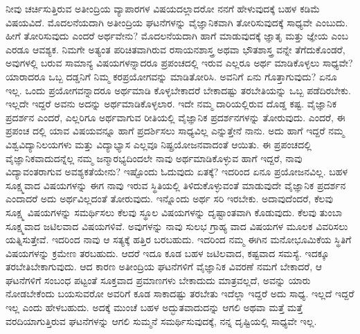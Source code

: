 ನೀವು ಚರ್ಚಿಸುತ್ತಿರುವ ಅತೀಂದ್ರಿಯ ವ್ಯಾಪಾರಗಳ ವಿಷಯದಲ್ಲಾದರೋ ನನಗೆ ಹೇಳುವುದಕ್ಕೆ ಬಹಳ ಕಡಿಮೆ ವಿಷಯವಿದೆ. ಮೊದಲನೆಯದಾಗಿ ಅತೀಂದ್ರಿಯ ಘಟನೆಗಳನ್ನು ವೈಜ್ಞಾನಿಕವಾಗಿ ತೋರಿಸುವುದಕ್ಕೆ ಸಾಧ್ಯವೇ ಎಂಬುದು. ಹೀಗೆ ತೋರಿಸುವುದು ಎಂದರೆ ಅರ್ಥವೇನು? ಮೊದಲನೆಯದಾಗಿ ಹಾಗೆ ಮಾಡುವುದಕ್ಕೆ ಜ್ಞಾತೃ ಮತ್ತು ಜ್ಞೇಯ ಎಂಬ ಎರಡೂ ಆವಶ್ಯಕ. ನಿಮಗೇ ಅತ್ಯಂತ ಪರಿಚಿತವಾಗಿರುವ ರಸಾಯನಶಾಸ್ತ್ರ ಅಥವಾ ಭೌತಶಾಸ್ತ್ರ ವನ್ನೇ ತೆಗೆದುಕೊಂಡರೆ, ಅವುಗಳಲ್ಲಿ ಬರುವ ಸಾಮಾನ್ಯ ವಿಷಯಗಳನ್ನಾದರೂ ಪ್ರಪಂಚದಲ್ಲಿ ಇರುವ ಎಲ್ಲರೂ ಅರ್ಥ ಮಾಡಿಕೊಳ್ಳಲು ಸಾಧ್ಯವೇ? ಯಾರಾದರೂ ಒಬ್ಬ ದಡ್ಡನಿಗೆ ನಿಮ್ಮ ಕರಪ್ರಯೋಗವನ್ನು ಮಾಡಿತೋರಿಸಿ. ಅವನಿಗೆ ಏನು ಗೊತ್ತಾಗುವುದು? ಏನೂ ಇಲ್ಲ. ಒಂದು ಪ್ರಯೋಗವನ್ನಾದರೂ ಅರ್ಥಮಾಡಿ ಕೊಳ್ಳಬೇಕಾದರೆ ಬೇಕಾದಷ್ಟು ತರಬೇತಿಯನ್ನು ಒಬ್ಬ ಪಡೆದಿರಬೇಕು. ಇಲ್ಲದೇ ಇದ್ದರೆ ಅವನು ಅದನ್ನು ಅರ್ಥಮಾಡಿಕೊಳ್ಳಲಾರ. ಇದೇ ನಮ್ಮ ದಾರಿಯಲ್ಲಿರುವ ದೊಡ್ಡ ಕಷ್ಟ. ವೈಜ್ಞಾನಿಕ ಪ್ರದರ್ಶನ ಎಂದರೆ, ಎಲ್ಲರಿಗೂ ಅರ್ಥವಾಗುವ ರೀತಿಯಲ್ಲಿ ವೈಜ್ಞಾನಿಕ ಪ್ರದರ್ಶನಗಳನ್ನು ತೋರುವುದು. ಎಂದರೆ, ಈ ಪ್ರಪಂಚ ದಲ್ಲಿ ಯಾವ ವಿಷಯವನ್ನೂ ಹಾಗೆ ಪ್ರದರ್ಶಿಸಲು ಸಾಧ್ಯವಿಲ್ಲ ಎನ್ನುತ್ತೇನೆ ನಾನು. ಅದು ಹಾಗೆ ಇದ್ದರೆ ನಮ್ಮ ವಿಶ್ವವಿದ್ಯಾನಿಲಯಗಳು ಮತ್ತು ವಿದ್ಯಾಭ್ಯಾಸ ಎಲ್ಲವೂ ನಿಷ್ಪ್ರಯೋಜನವಾದಂತೆ ಆಯಿತು. ಈ ಪ್ರಪಂಚದಲ್ಲಿ ವೈಜ್ಞಾನಿಕವಾದುದನ್ನೆಲ್ಲ ನಮ್ಮ ಜನ್ಮಾರಭ್ಯದಿಂದಲೇ ನಾವು ಅರ್ಥಮಾಡಿಕೊಳ್ಳುವ ಹಾಗೆ ಇದ್ದರೆ, ನಾವು ವಿದ್ಯಾವಂತರಾಗುವ ಅವಶ್ಯಕತೆಯೇನು? ಇಷ್ಟೊಂದು ಓದುವುದು ಏತಕ್ಕೆ? ಇದರಿಂದ ಏನೂ ಪ್ರಯೋಜನವಿಲ್ಲ. ಬಹಳ ಸೂಕ್ಷ್ಮವಾದ ವಿಷಯಗಳನ್ನು ಈಗ ನಾವು ಇರುವ ಸ್ಥಿತಿಯಲ್ಲಿ ತಿಳಿದುಕೊಳ್ಳುವಂತೆ ಮಾಡುವುದೇ ವೈಜ್ಞಾನಿಕ ಪ್ರದರ್ಶನ ಎಂದಾದರೆ ಅದು ಅರ್ಥವಿಲ್ಲದಂತೆ ತೋರುವುದು. ಇನ್ನೊಂದು ಅರ್ಥ ಸರಿ ಇರಬೇಕು. ಅದಾವುದೆಂದರೆ, ಕೆಲವು ಸೂಕ್ಷ್ಮ ವಿಷಯಗಳನ್ನು ಸಮರ್ಥಿಸಲು ಕೆಲವು ಸ್ಥೂಲ ವಿಷಯಗಳನ್ನು ದೃಷ್ಟಾಂತವಾಗಿ ಕೊಡುವುದು. ಕೆಲವು ತುಂಬಾ ಸೂಕ್ಷ್ಮವಾದ ಜಟಿಲವಾದ ವಿಷಯಗಳಿವೆ. ಅವುಗಳನ್ನು ನಾವು ಸುಲಭ ಗ್ರಾಹ್ಯ ವಾದ ವಿಷಯಗಳ ಮೂಲಕ ವಿವರಿಸಲು ಯತ್ನಿಸುತ್ತೇವೆ. ಇದರಿಂದ ನಾವು ಆ ಸತ್ಯಕ್ಕೆ ಹತ್ತಿರ ಬರಬಹುದು. ಇದರಿಂದ ನಮ್ಮ ಈಗಿನ ಮನೋಭೂಮಿಕೆಯ ಸ್ಥಿತಿಗೆ ವಿಷಯಗಳನ್ನು ಕ್ರಮೇಣ ತರಬಹುದು. ಆದರೆ ಇದೂ ಕೂಡ ಬಹಳ ಜಟಿಲವಾದ, ಕಷ್ಟವಾದ ಸಮಸ್ಯೆ. ಇದಕ್ಕೂ ತರಬೇತಿಬೇಕಾಗುವುದು. ಆದ ಕಾರಣ ಅತೀಂದ್ರಿಯ ಘಟನೆಗಳಿಗೆ ವೈಜ್ಞಾನಿಕ ವಿವರಣೆ ನಮಗೆ ಬೇಕಾದರೆ, ಆ ಘಟನೆಗಳಿಗೆ ಸಂಬಂಧ ಪಟ್ಟಂತೆ ಸೂಕ್ತವಾದ ಪ್ರಮಾಣಗಳು ಬೇಕಾದುದು ಮಾತ್ರವಲ್ಲದೆ, ಅವನ್ನು ಯಾರು ನೋಡಬೇಕೆಂದು ಬಯಸುವರೋ ಅವರಿಗೆ ಕೂಡ ಸಾಕಾದಷ್ಟು ತರಬೇತು ಇದೆಲ್ಲಾ ಇದ್ದರೆ ಅದು ಸಾಧ್ಯ. ಇಲ್ಲದೆ ಇದ್ದರೆ ಇಲ್ಲ ಎಂದು ಹೇಳಬಹುದು. ಅದಕ್ಕೆ ಮುಂಚೆ ಬಹಳ ಅದ್ಭುತವಾದುದನ್ನು ಆಗಲಿ ಅಥವಾ ಮತ್ತೆ ಮತ್ತೆ ವರದಿಯಾಗುತ್ತಿರುವ ಘಟನೆಗಳನ್ನು ಆಗಲಿ ಸುಮ್ಮನೆ ಸಮರ್ಥಿಸುವುದಕ್ಕೆ, ನನ್ನ ದೃಷ್ಟಿಯಲ್ಲಿ ಸಾಧ್ಯವೇ ಇಲ್ಲ.

